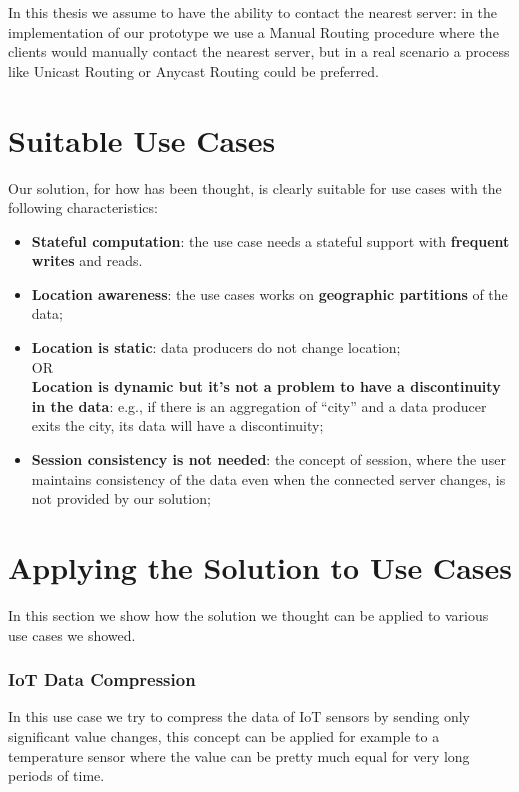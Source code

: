 In this thesis we assume to have the ability to contact the nearest server: in the implementation of our prototype we use a Manual Routing procedure where the clients would manually contact the nearest server, but in a real scenario a process like Unicast Routing or Anycast Routing could be preferred.


\section{Suitable Use Cases}
Our solution, for how has been thought, is clearly suitable for use cases with the following characteristics:
\begin{itemize}
    \item \textbf{Stateful computation}: the use case needs a stateful support with \textbf{frequent writes} and reads.
    \item \textbf{Location awareness}: the use cases works on \textbf{geographic partitions} of the data;
    \item \textbf{Location is static}: data producers do not change location;\\OR\\\textbf{Location is dynamic but it’s not a problem to have a discontinuity in the data}: e.g., if there is an aggregation of “city” and a data producer exits the city, its data will have a discontinuity;
    \item \textbf{Session consistency is not needed}: the concept of session, where the user maintains consistency of the data even when the connected server changes, is not provided by our solution;
\end{itemize}


\section{Applying the Solution to Use Cases}
\label{sec:solution_use_cases}
In this section we show how the solution we thought can be applied to various use cases we showed.


\subsubsection{IoT Data Compression}
In this use case we try to compress the data of IoT sensors by sending only significant value changes, this concept can be applied for example to a temperature sensor where the value can be pretty much equal for very long periods of time.

